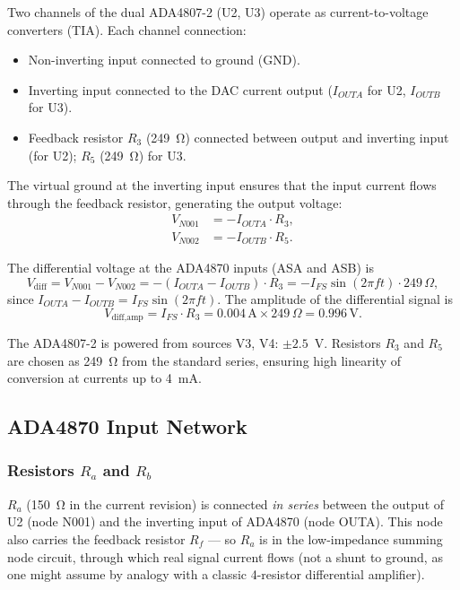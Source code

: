 \documentclass[a4paper, 12pt]{article}
\begin{document}
Two channels of the dual ADA4807-2 (U2, U3) operate as current-to-voltage
converters (TIA).
Each channel connection:
\begin{itemize}
    \item Non-inverting input connected to ground (GND).
    \item Inverting input connected to the DAC current output
          (\(I_{OUTA}\) for U2, \(I_{OUTB}\) for U3).
    \item Feedback resistor \(R_3\) (249~Ω) connected between output and
          inverting input (for U2); \(R_5\) (249~Ω) for U3.
\end{itemize}
The virtual ground at the inverting input ensures that the input current
flows through the feedback resistor, generating the output voltage:
\begin{align}
    V_{N001} &= -I_{OUTA} \cdot R_3, \label{eq:v_n001}\\
    V_{N002} &= -I_{OUTB} \cdot R_5. \label{eq:v_n002}
\end{align}

The differential voltage at the ADA4870 inputs (ASA and ASB) is
\begin{equation}
    V_{\text{diff}} = V_{N001} - V_{N002}
    = -(I_{OUTA} - I_{OUTB}) \cdot R_3
    = -I_{FS}\sin(2\pi f t) \cdot 249\,\Omega,
\end{equation}
since \(I_{OUTA} - I_{OUTB} = I_{FS}\sin(2\pi f t)\).
The amplitude of the differential signal is
\[
    V_{\text{diff,amp}} = I_{FS} \cdot R_3 = 0.004\,\text{A} \times 249\,\Omega
    = 0.996\,\text{V}.
\]

The ADA4807-2 is powered from sources V3, V4: $\pm 2.5$~V.
Resistors \(R_3\) and \(R_5\) are chosen as 249~Ω from the standard
series, ensuring high linearity of conversion at currents up to 4~mA.

\subsection{ADA4870 Input Network}

\subsubsection{Resistors \texorpdfstring{\(R_{a}\) and \(R_{b}\)}{Ra and Rb}}

\textbf{\(R_{a}\)} (150~Ω in the current revision) is connected
\emph{in series} between the output of U2 (node N001) and the inverting
input of ADA4870 (node OUTA). This node also carries the feedback
resistor \(R_f\) — so \(R_a\) is in the low-impedance summing node
circuit, through which real signal current flows (not a shunt to ground,
as one might assume by analogy with a classic 4-resistor differential
amplifier).
\end{document}
